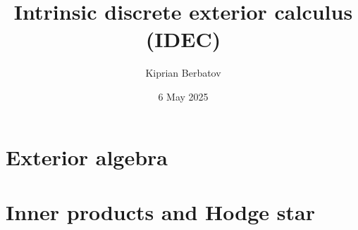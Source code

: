 \documentclass{article}
\title{Intrinsic discrete exterior calculus (IDEC)}
\author{Kiprian Berbatov}
\date{6 May 2025}
\theoremstyle{definition}
\begin{document}

\maketitle

\tableofcontents
\NewCommandCopy\oricontentsline\contentsline
\makeatletter
\RenewDocumentCommand{}
{%
  {\let\numberline\@gobble
    }%
}
\makeatother

\listoffigures

\listoftables


\section{Exterior algebra}
\label{section:exterior_algebra}
















\section{Inner products and Hodge star}
\label{section:inner_products_and_hodge_star}










\end{document}
